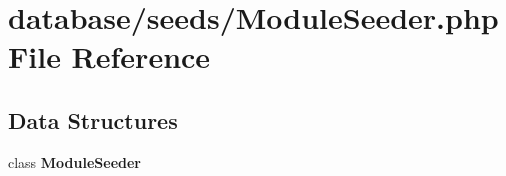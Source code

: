 \section{database/seeds/\+Module\+Seeder.php File Reference}
\label{_module_seeder_8php}
\subsection*{Data Structures}
\begin{DoxyCompactItemize}
\item 
class {\bf Module\+Seeder}
\end{DoxyCompactItemize}
